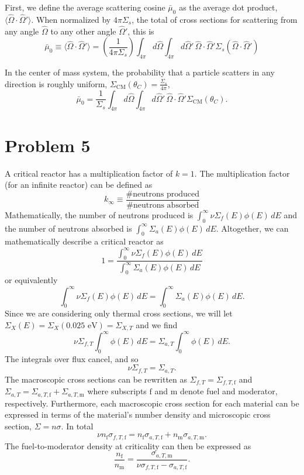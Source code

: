 \documentclass{article}
\newcommand{\Oh}{\hat{\Omega}}
\begin{document}
First, we define the average scattering cosine $\bar{\mu}_0$ as the average dot product, $\langle \Oh \cdot \Oh' \rangle$. When normalized by $4\pi\Sigma_s$, the total of cross sections for scattering from any angle $\Oh$ to any other angle $\Oh'$, this is
$$ \bar{\mu}_0 \equiv \langle \Oh \cdot \Oh' \rangle = \left(\frac{1}{4\pi\Sigma_s}\right)  \int_{4\pi} d\Oh \int_{4\pi} d\Oh' \, \Oh \cdot \Oh' \Sigma_s(\Oh \cdot \Oh') $$

In the center of mass system, the probability that a particle scatters in any direction is roughly uniform, $\Sigma_{\text{CM}}(\theta_C) = \frac{\Sigma_s}{4\pi}$,
$$ \bar{\mu}_0 = \frac{1}{\Sigma_s}  \int_{4\pi} d\Oh \int_{4\pi} d\Oh' \, \Oh \cdot \Oh' \Sigma_{\text{CM}}(\theta_C) .$$



\newpage

\section*{Problem 5}

A critical reactor has a multiplication factor of $k=1$. The multiplication factor (for an infinite reactor) can be defined as
$$ k_{\infty} \equiv \frac{\text{\# neutrons produced}}{\text{\# neutrons absorbed}} $$
Mathematically, the number of neutrons produced is $\int_0^{\infty} \nu \Sigma_f(E)\phi(E)\,dE$ and the number of neutrons absorbed is $\int_0^{\infty} \Sigma_a(E)\phi(E)\,dE$. Altogether, we can mathematically describe a critical reactor as 
$$ 1 = \frac{\int_0^{\infty} \nu \Sigma_f(E)\phi(E)\,dE}{\int_0^{\infty} \Sigma_a(E)\phi(E)\,dE} $$
or equivalently
$$ \int_0^{\infty} \nu \Sigma_f(E)\phi(E)\,dE = \int_0^{\infty} \Sigma_a(E)\phi(E)\,dE. $$
Since we are considering only thermal cross sections, we will let $\Sigma_X(E) = \Sigma_X(0.025\text{ eV}) = \Sigma_{X,T}$ and we find
$$ \nu \Sigma_{f,T} \int_0^{\infty} \phi(E)\,dE = \Sigma_{a,T} \int_0^{\infty} \phi(E)\,dE. $$
The integrals over flux cancel, and so
$$ \nu \Sigma_{f,T} = \Sigma_{a,T} .$$
The macroscopic cross sections can be rewritten as $\Sigma_{f,T} = \Sigma_{f,T,\text{f}}$ and $\Sigma_{a,T} = \Sigma_{a,T,\text{f}} + \Sigma_{a,T,\text{m}}$ where subscripts $\text{f}$ and $\text{m}$ denote fuel and moderator, respectively. Furthermore, each macroscopic cross section for each material can be expressed in terms of the material's number density and microscopic cross section, $\Sigma = n\sigma$. In total
$$ \nu n_{\text{f}} \sigma_{f,T,\text{f}} = n_{\text{f}} \sigma_{a,T,\text{f}} + n_{\text{m}} \sigma_{a,T,\text{m}} .$$
The fuel-to-moderator density at criticality can then be expressed as
$$ \frac{n_{\text{f}}}{n_{\text{m}}} = \frac{\sigma_{a,T,\text{m}}}{\nu \sigma_{f,T,\text{f}} - \sigma_{a,T,\text{f}}} .$$
\-\\
\end{document}
